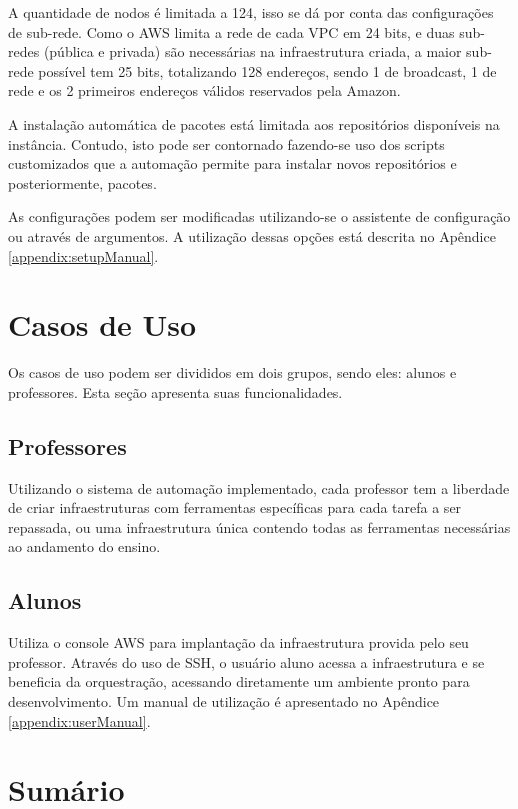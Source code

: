 \documentclass[tg]{mdtufsm}
\begin{document}
A quantidade de nodos é limitada a 124, isso se dá por conta das configurações de sub-rede. Como o AWS limita a rede de cada VPC em 24 bits, e duas sub-redes (pública e privada) são necessárias na infraestrutura criada, a maior sub-rede possível tem 25 bits, totalizando 128 endereços, sendo 1 de broadcast, 1 de rede e os 2 primeiros endereços válidos reservados pela Amazon.

A instalação automática de pacotes está limitada aos repositórios disponíveis na instância. Contudo, isto pode ser contornado fazendo-se uso dos scripts customizados que a automação permite para instalar novos repositórios e posteriormente, pacotes.

As configurações podem ser modificadas utilizando-se o assistente de configuração ou através de argumentos. A utilização dessas opções está descrita no Apêndice \ref{appendix:setupManual}.


\section{Casos de Uso}

Os casos de uso podem ser divididos em dois grupos, sendo eles: alunos e professores. Esta seção apresenta suas funcionalidades.

\subsection{Professores}

Utilizando o sistema de automação implementado, cada professor tem a liberdade de criar infraestruturas com ferramentas específicas para cada tarefa a ser repassada, ou uma infraestrutura única contendo todas as ferramentas necessárias ao andamento do ensino.

\subsection{Alunos}

Utiliza o console AWS para implantação da infraestrutura provida pelo seu professor. Através do uso de SSH, o usuário aluno acessa a infraestrutura e se beneficia da orquestração, acessando diretamente um ambiente pronto para desenvolvimento. Um manual de utilização é apresentado no Apêndice \ref{appendix:userManual}.


\section{Sumário}
\end{document}
